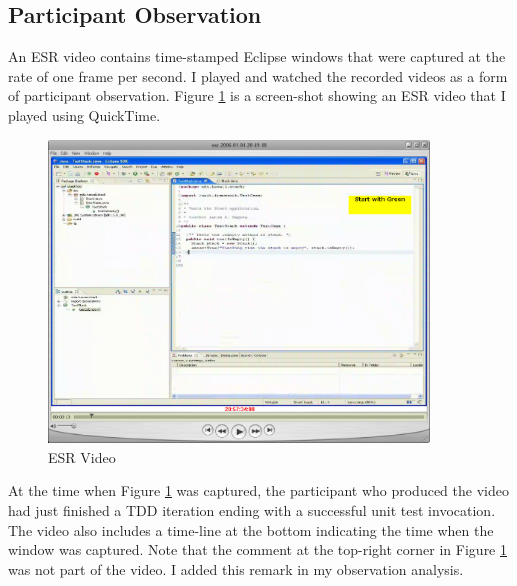 \subsection{Participant Observation}
\label{sec:Pilot-Observation}
An ESR video contains time-stamped Eclipse windows that were captured at the rate of one frame per second. I played and watched the recorded videos as a form of participant observation. Figure \ref{fig:EsrVideo} is a screen-shot showing an ESR video that I played using QuickTime\cite{QuickTime}.
\begin{figure}[htbp]
  \centering
  \includegraphics[width=0.9\textwidth]{figs/ESR-Video}
  \caption{ESR Video}
  \label{fig:EsrVideo}
\end{figure}
At the time when Figure \ref{fig:EsrVideo} was captured, the participant who produced the video had just finished a TDD iteration ending with a successful unit test invocation. The video also includes a time-line at the bottom indicating the time when the window was captured. Note that the comment at the top-right corner in Figure \ref{fig:EsrVideo} was not part of the video. I added this remark in my observation analysis. 

